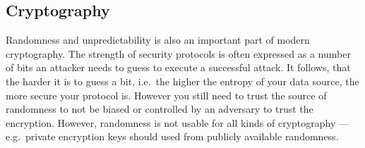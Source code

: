 \subsection{Cryptography}\label{subsec:usecase_cryptography}
Randomness and unpredictability is also an important part of modern cryptography. The strength of security protocols is often expressed as a number of bits an attacker needs to guess to execute a successful attack. It follows, that the harder it is to guess a bit, i.e.\ the higher the entropy of your data source, the more secure your protocol is. However you still need to trust the source of randomness to not be biased or controlled by an adversary to trust the encryption. 
However, randomness is not usable for all kinds of cryptography --- e.g.\ private encryption keys should used from publicly available randomness. 
